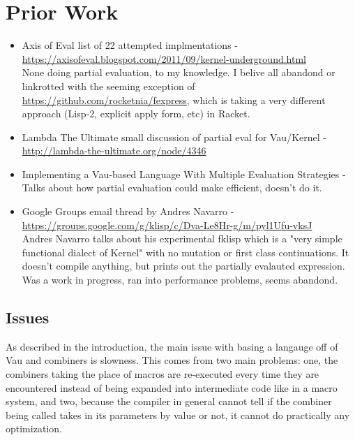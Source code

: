 \documentclass[acmsmall]{acmart}
\begin{document}
\section{Prior Work}
\begin{itemize}
    \item{} Axis of Eval list of 22 attempted implmentations - \url{https://axisofeval.blogspot.com/2011/09/kernel-underground.html} \\ 
      None doing partial evaluation, to my knowledge. I belive all abandond or linkrotted with the seeming exception of \url{https://github.com/rocketnia/fexpress},
      which is taking a very different approach (Lisp-2, explicit apply form, etc) in Racket.
    \item{} Lambda The Ultimate small discussion of partial eval for Vau/Kernel - \url{http://lambda-the-ultimate.org/node/4346} \\ 
    \item{} Implementing a Vau-based Language With Multiple Evaluation Strategies - \cite{kearsleyimplementing} \\
      Talks about how partial evaluation could make efficient, doesn't do it.
    \item{} Google Groups email thread by Andres Navarro - \url{https://groups.google.com/g/klisp/c/Dva-Le8Hr-g/m/pyl1Ufu-vksJ} \\
      Andres Navarro talks about his experimental fklisp which is a "very simple functional dialect of Kernel" with no mutation or first class continuations.
      It doesn't compile anything, but prints out the partially evalauted expression. Was a work in progress, ran into performance problems, seems abandond.
\end{itemize}

\subsection{Issues}
  As described in the introduction, the main issue with basing a langauge off of Vau and combiners is slowness.
  This comes from two main problems: one, the combiners taking the place of macros are re-executed every time
  they are encountered instead of being expanded into intermediate code like in a macro system, and two, because
  the compiler in general cannot tell if the combiner being called takes in its parameters by value or not, it cannot
  do practically any optimization.
\end{document}
